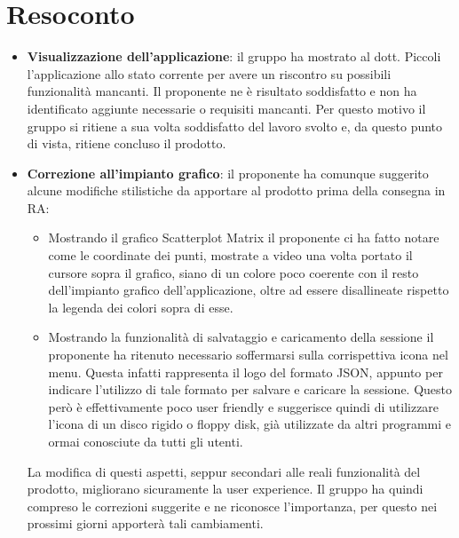 \section{Resoconto}
\begin{itemize}
		\item \textbf{Visualizzazione dell'applicazione}: il gruppo ha mostrato al dott. Piccoli l'applicazione allo stato corrente per avere un riscontro su possibili funzionalità mancanti. Il proponente ne è risultato soddisfatto e non ha identificato aggiunte necessarie o requisiti mancanti. Per questo motivo il gruppo si ritiene a sua volta soddisfatto del lavoro svolto e, da questo punto di vista, ritiene concluso il prodotto. 
		\item \textbf{Correzione all'impianto grafico}: il proponente ha comunque suggerito alcune modifiche stilistiche da apportare al prodotto prima della consegna in RA:
		\begin{itemize}
			\item Mostrando il grafico Scatterplot Matrix il proponente ci ha fatto notare come le coordinate dei punti, mostrate a video una volta portato il cursore sopra il grafico, siano di un colore poco coerente con il resto dell'impianto grafico dell'applicazione, oltre ad essere disallineate rispetto la legenda dei colori sopra di esse.
			\item Mostrando la funzionalità di salvataggio e caricamento della sessione il proponente ha ritenuto necessario soffermarsi sulla corrispettiva icona nel menu. Questa infatti rappresenta il logo del formato JSON, appunto per indicare l'utilizzo di tale formato per salvare e caricare la sessione. Questo però è effettivamente poco user friendly e suggerisce quindi di utilizzare l'icona di un disco rigido o floppy disk, già utilizzate da altri programmi e ormai conosciute da tutti gli utenti.  
		\end{itemize}
		La modifica di questi aspetti, seppur secondari alle reali funzionalità del prodotto, migliorano sicuramente la user experience. Il gruppo ha quindi compreso le correzioni suggerite e ne riconosce l'importanza, per questo nei prossimi giorni apporterà tali cambiamenti.
\end{itemize}
\newpage